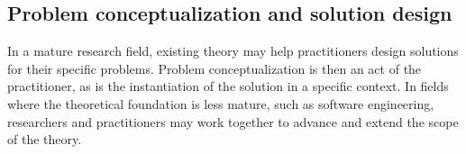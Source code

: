 \documentclass[graybox]{svmult}
\newcommand{\emelie}[1]{\textcolor{red}{{\it [Emelie says: #1]}}}
\newcommand{\peggy}[1]{\textcolor{blue}{{\it [Peggy says: #1]}}}
\newcommand{\per}[1]{\textcolor{cyan}{{\it [Per says: #1]}}}
\newcommand{\emelie}[1]{}
\newcommand{\peggy}[1]{}
\newcommand{\per}[1]{}
\begin{document}


\subsection{Problem conceptualization and solution design}


In a mature research field, existing theory may help practitioners design solutions for their specific problems. Problem conceptualization is then an act of the practitioner, as is the instantiation of the solution in a specific context. In fields where the theoretical foundation is less mature, such as software engineering, researchers and practitioners may work together to advance and extend the scope of the theory. 
\end{document}
